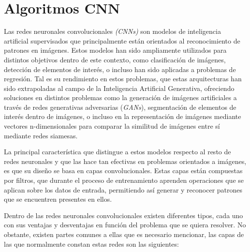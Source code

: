 \section{Algoritmos CNN}
\label{CNN_SECTION}



Las redes neuronales convolucionales \textit{(CNNs)} son modelos de inteligencia artificial supervisados que principalmente están orientados al reconocimiento de patrones en imágenes. Estos modelos han sido ampliamente utilizados para distintos objetivos dentro de este contexto, como clasificación de imágenes, detección de elementos de interés, o incluso han sido aplicadas a problemas de regresión. Tal es su rendimiento en estos problemas, que estas arquitecturas han sido extrapoladas al campo de la Inteligencia Artificial Generativa, ofreciendo soluciones en distintos problemas como la generación de imágenes artificiales a través de redes generativas adversarias (\textit{GANs}), segmentación de elementos de interés dentro de imágenes, o incluso en la representación de imágenes mediante vectores n-dimensionales para comparar la similitud de imágenes entre sí mediante redes siamesas.

La principal característica que distingue a estos modelos respecto al resto de redes neuronales y que las hace tan efectivas en problemas orientados a imágenes, es que su diseño se basa en capas convolucionales. Estas capas están compuestas por filtros, que durante el proceso de entrenamiento aprenden operaciones que se aplican sobre los datos de entrada, permitiendo así generar y reconocer patrones que se encuentren presentes en ellos.

Dentro de las redes neuronales convolucionales existen diferentes tipos, cada uno con sus ventajas y desventajas en función del problema que se quiera resolver. No obstante, existen partes comunes a ellas que es necesario mencionar, las capas de las que normalmente constan estas redes son las siguientes:

